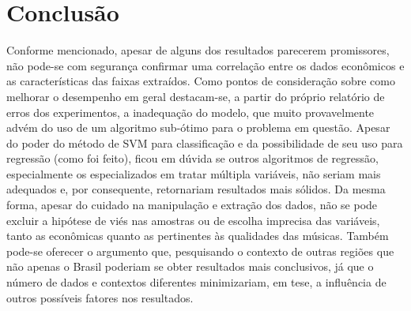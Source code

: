 \chapter{Conclusão}
\label{c.conclusao}

Conforme mencionado, apesar de alguns dos resultados parecerem promissores, não pode-se com segurança confirmar uma correlação entre os dados econômicos e as características das faixas extraídos. Como pontos de consideração sobre como melhorar o desempenho em geral destacam-se, a partir do próprio relatório de erros dos experimentos, a inadequação do modelo, que muito provavelmente advém do uso de um algoritmo sub-ótimo para o problema em questão. Apesar do poder do método de SVM para classificação e da possibilidade de seu uso para regressão (como foi feito), ficou em dúvida se outros algoritmos de regressão, especialmente os especializados em tratar múltipla variáveis, não seriam mais adequados e, por consequente, retornariam resultados mais sólidos. Da mesma forma, apesar do cuidado na manipulação e extração dos dados, não se pode excluir a hipótese de viés nas amostras ou de escolha imprecisa das variáveis, tanto as econômicas quanto as pertinentes às qualidades das músicas. Também pode-se oferecer o argumento que, pesquisando o contexto de outras regiões que não apenas o Brasil poderiam se obter resultados mais conclusivos, já que o número de dados e contextos diferentes minimizariam, em tese, a influência de outros possíveis fatores nos resultados.